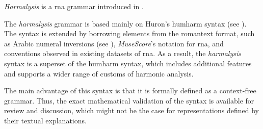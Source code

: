 

\emph{Harmalysis} is a \gls{rna} grammar introduced in
\textcite{napoleslopez2020harmalysis}.

The \emph{harmalysis} grammar is based mainly on Huron's
\gls{humharm} syntax (see ).
The syntax is extended by borrowing elements from the
\gls{romantext} format, such as Arabic numeral inversions
(see ), \emph{MuseScore}'s notation
for
\gls{rna},
and conventions observed in existing datasets of \gls{rna}.
As  a result,  the \emph{harmalysis} syntax is a superset of
the \gls{humharm} syntax,  which includes additional
features and supports a wider range of customs of harmonic
analysis.

The main advantage of this syntax is that it is formally
defined as a context-free grammar. Thus, the exact
mathematical validation of the syntax is available for
review and discussion, which might not be the case for
representations defined by their textual explanations.
